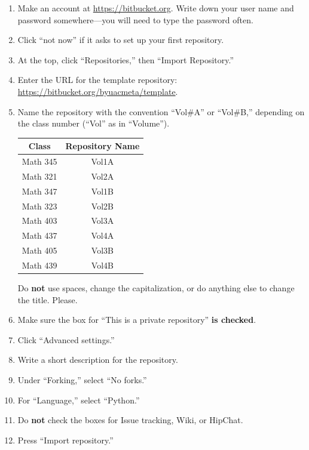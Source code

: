 \begin{enumerate}
    \item Make an account at \url{https://bitbucket.org}.
    Write down your user name and password somewhere---you will need to type the password often.
    \item Click ``not now'' if it asks to set up your first repository.
    \item At the top, click ``Repositories,'' then ``Import Repository.''
    \item Enter the URL for the template repository:\\\url{https://bitbucket.org/byuacmeta/template}.
    \item Name the repository with the convention ``Vol\#A'' or ``Vol\#B,'' depending on the class number (``Vol'' as in ``Volume'').

    \begin{table}[H]
    \begin{tabular}{c|c}
        Class & Repository Name \\
        \hline
        Math 345 & Vol1A \\
        Math 321 & Vol2A \\
        Math 347 & Vol1B \\
        Math 323 & Vol2B \\
        Math 403 & Vol3A \\
        Math 437 & Vol4A \\
        Math 405 & Vol3B \\
        Math 439 & Vol4B
    \end{tabular}
    \end{table}

    Do \textbf{not} use spaces, change the capitalization, or do anything else to change the title.
    Please.

    \item Make sure the box for ``This is a private repository'' \textbf{is checked}.
    \item Click ``Advanced settings.''
    \item Write a short description for the repository.
    \item Under ``Forking,'' select ``No forks.''
    \item For ``Language,'' select ``Python.''
    \item Do \textbf{not} check the boxes for Issue tracking, Wiki, or HipChat.
    \item Press ``Import repository.''
\end{enumerate}

